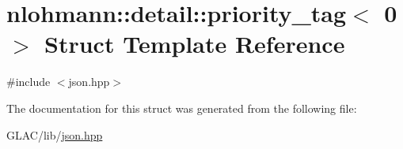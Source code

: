 \hypertarget{structnlohmann_1_1detail_1_1priority__tag_3_010_01_4}{}\section{nlohmann\+::detail\+::priority\+\_\+tag$<$ 0 $>$ Struct Template Reference}
\label{structnlohmann_1_1detail_1_1priority__tag_3_010_01_4}


{\ttfamily \#include $<$json.\+hpp$>$}



The documentation for this struct was generated from the following file\+:\begin{DoxyCompactItemize}
\item 
G\+L\+A\+C/lib/\mbox{\hyperlink{json_8hpp}{json.\+hpp}}\end{DoxyCompactItemize}

